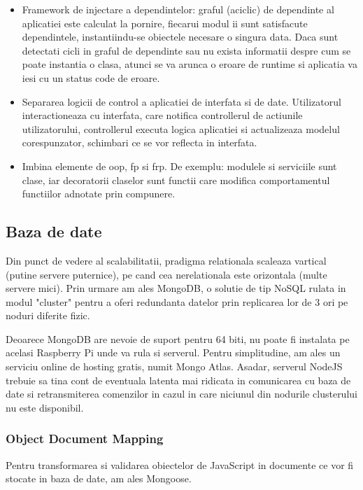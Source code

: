 \begin{itemize}
  \item Framework de injectare a dependintelor: graful (aciclic) de dependinte al aplicatiei este calculat la pornire, fiecarui modul ii sunt satisfacute dependintele, instantiindu-se obiectele necesare o singura data. Daca sunt detectati cicli in graful de dependinte sau nu exista informatii despre cum se poate instantia o clasa, atunci se va arunca o eroare de runtime si aplicatia va iesi cu un status code de eroare. 
  \item Separarea logicii de control a aplicatiei de interfata si de date. Utilizatorul interactioneaza cu interfata, care notifica controllerul de actiunile utilizatorului, controllerul executa logica aplicatiei si actualizeaza modelul corespunzator, schimbari ce se vor reflecta in interfata.
  \item Imbina elemente de \acrfull{oop}, \acrfull{fp} si \acrfull{frp}. De exemplu: modulele si serviciile sunt clase, iar decoratorii claselor sunt functii care modifica comportamentul functiilor adnotate prin compunere.

\end{itemize}

\subsection {Baza de date}

Din punct de vedere al scalabilitatii, pradigma relationala scaleaza vartical (putine servere puternice), pe cand cea nerelationala este orizontala (multe servere mici). Prin urmare am ales MongoDB, o solutie de tip NoSQL rulata in modul "cluster" pentru a oferi redundanta datelor prin replicarea lor de 3 ori pe noduri diferite fizic.

Deoarece MongoDB are nevoie de suport pentru 64 biti, nu poate fi instalata pe acelasi Raspberry Pi unde va rula si serverul. Pentru simplitudine, am ales un serviciu online de hosting gratis, numit Mongo Atlas. Asadar, serverul NodeJS trebuie sa tina cont de eventuala latenta mai ridicata in comunicarea cu baza de date si retransmiterea comenzilor in cazul in care niciunul din nodurile clusterului nu este disponibil.

\subsubsection {Object Document Mapping}

Pentru transformarea si validarea obiectelor de JavaScript in documente ce vor fi stocate in baza de date, am ales Mongoose.



